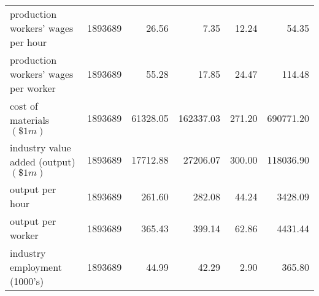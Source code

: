 \begin{table}[H]
\begin{tabular}{lrrrrr}
        production workers' wages per hour                      & 1893689 & 26.56     & 7.35       & 12.24   & 54.35      \\
        production workers' wages per worker                    & 1893689 & 55.28     & 17.85      & 24.47   & 114.48     \\
        cost of materials $(\$1m)$                              & 1893689 & 61328.05  & 162337.03  & 271.20  & 690771.20  \\
        industry value added (output) $(\$1m)$                  & 1893689 & 17712.88  & 27206.07   & 300.00  & 118036.90  \\
        output per hour                                         & 1893689 & 261.60    & 282.08     & 44.24   & 3428.09    \\
        output per worker                                       & 1893689 & 365.43    & 399.14     & 62.86   & 4431.44    \\
        industry employment (1000's)                            & 1893689 & 44.99     & 42.29      & 2.90    & 365.80     \\ \bottomrule\bottomrule
    \end{tabular}
\end{table}
